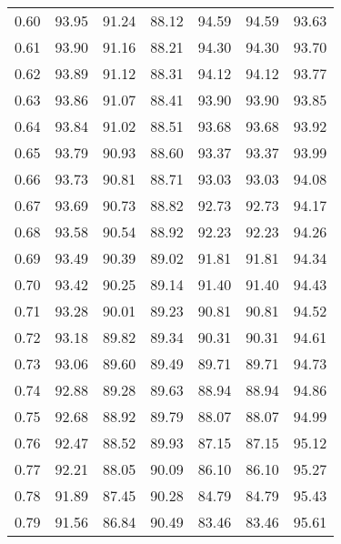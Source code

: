 \begin{tabular}{|c|c|c|c|c|c|c|}
      0.60 &     93.95 &     91.24 &      88.12 &   94.59 &      94.59 &         93.63 \\
      0.61 &     93.90 &     91.16 &      88.21 &   94.30 &      94.30 &         93.70 \\
      0.62 &     93.89 &     91.12 &      88.31 &   94.12 &      94.12 &         93.77 \\
      0.63 &     93.86 &     91.07 &      88.41 &   93.90 &      93.90 &         93.85 \\
      0.64 &     93.84 &     91.02 &      88.51 &   93.68 &      93.68 &         93.92 \\
      0.65 &     93.79 &     90.93 &      88.60 &   93.37 &      93.37 &         93.99 \\
      0.66 &     93.73 &     90.81 &      88.71 &   93.03 &      93.03 &         94.08 \\
      0.67 &     93.69 &     90.73 &      88.82 &   92.73 &      92.73 &         94.17 \\
      0.68 &     93.58 &     90.54 &      88.92 &   92.23 &      92.23 &         94.26 \\
      0.69 &     93.49 &     90.39 &      89.02 &   91.81 &      91.81 &         94.34 \\
      0.70 &     93.42 &     90.25 &      89.14 &   91.40 &      91.40 &         94.43 \\
      0.71 &     93.28 &     90.01 &      89.23 &   90.81 &      90.81 &         94.52 \\
      0.72 &     93.18 &     89.82 &      89.34 &   90.31 &      90.31 &         94.61 \\
      0.73 &     93.06 &     89.60 &      89.49 &   89.71 &      89.71 &         94.73 \\
      0.74 &     92.88 &     89.28 &      89.63 &   88.94 &      88.94 &         94.86 \\
      0.75 &     92.68 &     88.92 &      89.79 &   88.07 &      88.07 &         94.99 \\
      0.76 &     92.47 &     88.52 &      89.93 &   87.15 &      87.15 &         95.12 \\
      0.77 &     92.21 &     88.05 &      90.09 &   86.10 &      86.10 &         95.27 \\
      0.78 &     91.89 &     87.45 &      90.28 &   84.79 &      84.79 &         95.43 \\
      0.79 &     91.56 &     86.84 &      90.49 &   83.46 &      83.46 &         95.61 \\

\end{tabular}
